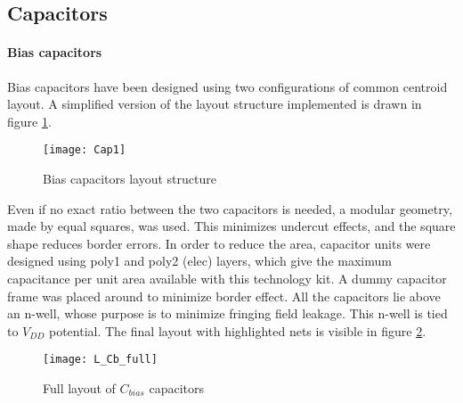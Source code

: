 \subsection{Capacitors}
\paragraph{Bias capacitors}
Bias capacitors have been designed using two configurations of common centroid layout.
A simplified version of the layout structure implemented is drawn in figure \ref{Cap1}. 
\begin{figure}[H]
	\centering
	\texttt{[image: Cap1]}
	\caption{Bias capacitors layout structure}
	\label{Cap1}
\end{figure}
Even if no exact ratio between the two capacitors is needed, a modular geometry, made by equal squares, was used. This minimizes undercut effects, and the square shape reduces border errors. In order to reduce the area, capacitor units were designed using poly1 and poly2 (elec) layers, which give the maximum capacitance per unit area available with this technology kit. A dummy capacitor frame was placed around to minimize border effect. All the capacitors lie above an n-well, whose purpose is to minimize fringing field leakage. This n-well is tied to \(V_{DD}\) potential. The final layout with highlighted nets is visible in figure \ref{L_Cb_full}.
\begin{figure}[H]
	\centering
	\texttt{[image: L\_Cb\_full]}
	\caption{Full layout of \(C_{bias}\) capacitors}
	\label{L_Cb_full}
\end{figure}

